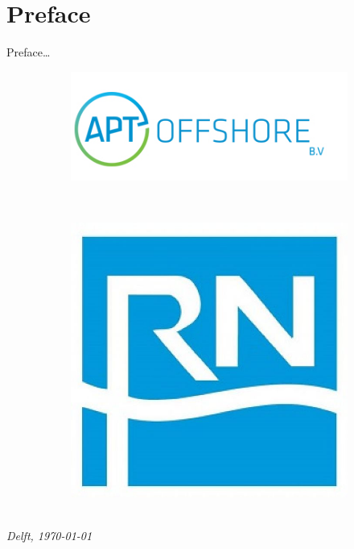 \chapter*{Preface}

Preface\ldots




\begin{figure}
    \centering
    \begin{subfigure}[b]{0.6\textwidth}
        \includegraphics[scale=0.5]{Images/APT.jpg}
    \end{subfigure}
    ~ %
    \begin{subfigure}[b]{0.22\textwidth}
        \includegraphics[scale=0.1]{Images/RD.jpg}
       
    \end{subfigure}
\end{figure}

\begin{flushright}
{\makeatletter\itshape
    \@author \\
    Delft, \today
\makeatother}
\end{flushright}

